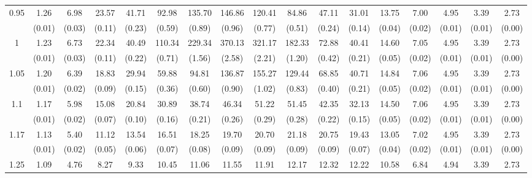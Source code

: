 \documentclass[12pt]{article}  %
\theoremstyle{plain}
\begin{document}
\begin{sidewaystable}[htbp]
\begin{tabular}{ccccccccccccccccc}
\multirow{2}{*}{0.95}  &1.26& 6.98& 23.57& 41.71 & 92.98 &135.70& 146.86 &120.41 & 84.86& 47.11 &31.01& 13.75 & 7.00 & 4.95 & 3.39 & 2.73 \\                
					  & (0.01)& (0.03)& (0.11)& (0.23)& (0.59)& (0.89)& (0.96)& (0.77)& (0.51)&  (0.24)&  (0.14)&  (0.04)&  (0.02)&  (0.01)&  (0.01) &    (0.00)\\ \hline
\multirow{2}{*}{1}  & 1.23& 6.73& 22.34& 40.49& 110.34& 229.34& 370.13& 321.17 &182.33 &72.88 &40.41& 14.60 & 7.05 & 4.95 & 3.39 & 2.73\\
                      & (0.01)& (0.03)& (0.11)& (0.22)& (0.71)& (1.56)& (2.58)& (2.21)& (1.20)&  (0.42)&  (0.21)&  (0.05)&  (0.02)&  (0.01)&  (0.01) &     (0.00)\\ \hline                                                                     
\multirow{2}{*}{1.05}  & 1.20 &6.39 &18.83 &29.94  &59.88 & 94.81& 136.87 &155.27& 129.44& 68.85& 40.71 &14.84 & 7.06 & 4.95 & 3.39 & 2.73\\
                      & (0.01)& (0.02)& (0.09)& (0.15)& (0.36)& (0.60)& (0.90)& (1.02)& (0.83)&  (0.40)&  (0.21)&  (0.05)&  (0.02)&  (0.01)&  (0.01)  &     (0.00)\\ \hline                                                                                                                                          
\multirow{2}{*}{1.1}  &1.17& 5.98& 15.08& 20.84 & 30.89 & 38.74 & 46.34 & 51.22 & 51.45& 42.35& 32.13& 14.50 & 7.06 & 4.95 & 3.39 & 2.73\\
                      &  (0.01)& (0.02)& (0.07)& (0.10)& (0.16)& (0.21)& (0.26)& (0.29)& (0.28)& (0.22)&  (0.15)&  (0.05)&  (0.02)&  (0.01)&  (0.01)  &     (0.00)\\ \hline
\multirow{2}{*}{1.17}  &1.13& 5.40 &11.12 &13.54 & 16.51 & 18.25 & 19.70 & 20.70 & 21.18& 20.75 &19.43 &13.05  &7.02  &4.95 & 3.39 & 2.73\\
                      & (0.01)& (0.02)& (0.05)& (0.06)& (0.07)& (0.08)& (0.09)& (0.09)& (0.09)&  (0.09)&  (0.07)&  (0.04)&  (0.02)&  (0.01)&  (0.01)  &   (0.00)\\ \hline                                                                                                                                                                                                                                                                                    
                                                                     \multirow{2}{*}{1.25}  &1.09 &4.76 & 8.27  &9.33 & 10.45  &11.06 & 11.55 & 11.91  &12.17 &12.32& 12.22 &10.58 & 6.84 & 4.94 & 3.39&  2.73\\

\end{tabular}
\end{sidewaystable}
\end{document}
